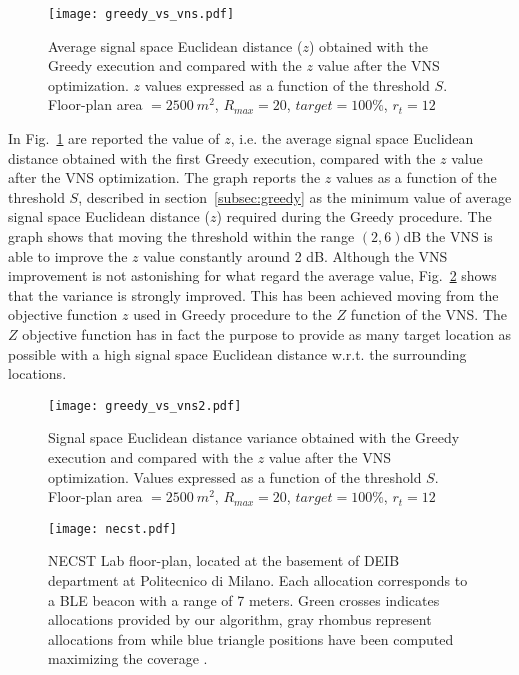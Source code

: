 \begin{figure}[h!tb]
\centering\texttt{[image: greedy\_vs\_vns.pdf]}
\caption{Average signal space Euclidean distance ($z$) obtained with the Greedy execution and compared with the $z$ value after the VNS optimization. $z$ values expressed as a function of the threshold $S$. Floor-plan area $=2500~m^2$, $R_{max} = 20$, $target = 100\%$, $r_t=12$}
\label{fig:greedy_vns}
\end{figure}

In Fig.~\ref{fig:greedy_vns} are reported the value of $z$, i.e. the average signal space Euclidean distance obtained with the first Greedy execution, compared with the $z$ value after the VNS optimization. The graph reports the $z$ values as a function of the threshold $S$, described in section~\ref{subsec:greedy} as the minimum value of average signal space Euclidean distance ($z$) required during the Greedy procedure. The graph shows that moving the threshold within the range $(2,6)$dB the VNS is able to improve the $z$ value constantly around 2 dB.
Although the VNS improvement is not astonishing for what regard the average value, Fig.~\ref{fig:greedy_vns2} shows that the variance is strongly improved. This has been achieved moving from the objective function $z$ used in Greedy procedure to the $Z$ function of the VNS. The $Z$ objective function has in fact the purpose to provide as many target location as possible with a high signal space Euclidean distance w.r.t. the surrounding locations.

\begin{figure}[h!tb]
\centering\texttt{[image: greedy\_vs\_vns2.pdf]}
\caption{Signal space Euclidean distance variance obtained with the Greedy execution and compared with the $z$ value after the VNS optimization. Values expressed as a function of the threshold $S$. Floor-plan area $=2500~m^2$, $R_{max} = 20$, $target = 100\%$, $r_t=12$}
\label{fig:greedy_vns2}
\end{figure}

\begin{figure}
\centering\texttt{[image: necst.pdf]}
\caption[NECST Lab floor-plan used as indoor environment testbed for deployments evaluation.]{NECST Lab floor-plan, located at the basement of DEIB department at Politecnico di Milano. Each allocation corresponds to a BLE beacon with a range of 7 meters. Green crosses indicates allocations provided by our algorithm, gray rhombus represent allocations from \cite{He2011} while blue triangle positions have been computed maximizing the coverage \cite{Kouakou2010a}.}
\label{fig:necst}
\end{figure}


